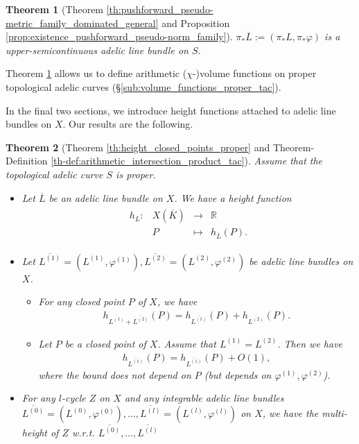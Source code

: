 \documentclass [11pt,reqno]{amsart}
\def\bR{{\mathbb{R}}}
\newcommand{\1}{\mathmybb{1}}
\newtheorem{theo}{Theorem}
\newcommand{\fonction}[5]{\begin{array}{l|rcl}
#1: & #2 & \longrightarrow & #3 \\
    & #4 & \longmapsto & #5 \end{array}}
\begin{document}
\begin{theo}[Theorem \ref{th:pushforward_pseudo-metric_family_dominated_general} and Proposition \ref{prop:existence_pushforward_pseudo-norm_family}]
\label{th_intro:pushforward_adelic_line_bundle}
$\pi_{\ast}\overline{L}:=(\pi_{\ast}L,\pi_{\ast}\varphi)$ is a upper-semicontinuous adelic line bundle on $S$.
\end{theo}

Theorem \ref{th_intro:pushforward_adelic_line_bundle} allows us to define arithmetic ($\chi$-)volume functions on proper topological adelic curves (\S \ref{sub:volume_functions_proper_tac}). 

In the final two sections, we introduce height functions attached to adelic line bundles on $X$. Our results are the following.

\begin{theo}[Theorem \ref{th:height_closed_points_proper} and Theorem-Definition \ref{th-def:arithmetic_intersection_product_tac}]
Assume that the topological adelic curve $S$ is proper.
\begin{itemize}
	\item[(1)] Let $\overline{L}$ be an adelic line bundle on $X$. We have a \emph{height function}
	\begin{align*}
	\fonction{h_{L}}{X(\overline{K})}{\bR}{P}{h_{\overline{L}}(P).}
	\end{align*}
	\item[(2)] Let $\overline{L^{(1)}}=(L^{(1)},\varphi^{(1)}),\overline{L^{(2)}}=(L^{(2)},\varphi^{(2)})$ be adelic line bundles on $X$.
	\begin{itemize}
		\item[(i)] For any closed point $P$ of $X$, we have
	\begin{align*}
	h_{\overline{L^{(1)}}+\overline{L^{(2)}}}(P) = h_{\overline{L^{(1)}}}(P) + h_{\overline{L^{(2)}}}(P).
	\end{align*}
		\item[(ii)] Let $P$ be a closed point of $X$. Assume that $L^{(1)}=L^{(2)}$. Then we have 
	\begin{align*}
	h_{\overline{L^{(1)}}}(P)= h_{\overline{L^{(1)}}}(P) + O(1),
	\end{align*}
	where the bound does not depend on $P$ (but depends on $\varphi^{(1)},\varphi^{(2)}$). 
	\end{itemize}
	\item[(3)] For any $l$-cycle $Z$ on $X$ and any integrable adelic line bundles $\overline{L^{(0)}}=(L^{(0)},\varphi^{(0)}),...,\overline{L^{(l)}}=(L^{(l)},\varphi^{(l)})$ on $X$, we have the \emph{multi-height} of $Z$ w.r.t. $\overline{L^{(0)}},...,\overline{L^{(l)}}$

\end{itemize}
\end{theo}
\end{document}
